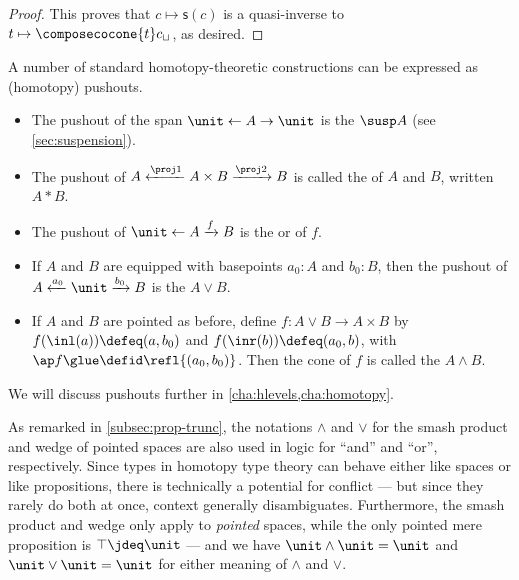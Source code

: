 \begin{proof}
This proves that $c\mapsto\mathsf{s}(c)$ is a quasi-inverse to $t\mapsto{}\composecocone{t}c_\sqcup$, as desired.
\end{proof}

A number of standard homotopy-theoretic constructions can be expressed as (homotopy) pushouts.
\begin{itemize}
\item The pushout of the span $\unit \leftarrow A \to \unit$ is the  $\susp A$ (see \cref{sec:suspension}).%
\item The pushout of $A \xleftarrow{\proj1} A\times B \xrightarrow{\proj2} B$ is called the  of $A$ and $B$, written $A*B$.%
\item The pushout of $\unit \leftarrow A \xrightarrow{f} B$ is the  or  of $f$.%
\item If $A$ and $B$ are equipped with basepoints $a_0:A$ and $b_0:B$, then the pushout of $A \xleftarrow{a_0} \unit \xrightarrow{b_0} B$ is the  $A\vee B$.%
\item If $A$ and $B$ are pointed as before, define $f:A\vee B \to A\times B$ by $f(\inl(a))\defeq (a,b_0)$ and $f(\inr(b))\defeq (a_0,b)$, with $\ap f \glue \defid \refl{(a_0,b_0)}$.
  Then the cone of $f$ is called the  $A\wedge B$.%
\end{itemize}
We will discuss pushouts further in \cref{cha:hlevels,cha:homotopy}.

\begin{rmk}
  As remarked in \cref{subsec:prop-trunc}, the notations $\wedge$ and $\vee$ for the smash product and wedge of pointed spaces are also used in logic for ``and'' and ``or'', respectively.
  Since types in homotopy type theory can behave either like spaces or like propositions, there is technically a potential for conflict --- but since they rarely do both at once, context generally disambiguates.
  Furthermore, the smash product and wedge only apply to \emph{pointed} spaces, while the only pointed mere proposition is $\top\jdeq\unit$ --- and we have $\unit\wedge \unit = \unit$ and $\unit\vee\unit=\unit$ for either meaning of $\wedge$ and $\vee$.
\end{rmk}

%

